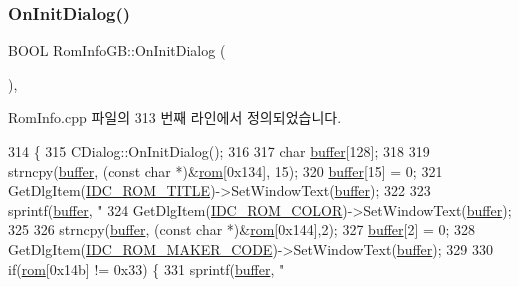 \subsubsection{\texorpdfstring{On\+Init\+Dialog()}{OnInitDialog()}}
{\footnotesize\ttfamily B\+O\+OL Rom\+Info\+G\+B\+::\+On\+Init\+Dialog (\begin{DoxyParamCaption}{ }\end{DoxyParamCaption})\hspace{0.3cm}{\ttfamily [protected]}, {\ttfamily [virtual]}}



Rom\+Info.\+cpp 파일의 313 번째 라인에서 정의되었습니다.


\begin{DoxyCode}
314 \{
315   CDialog::OnInitDialog();
316   
317   \textcolor{keywordtype}{char} \mbox{\hyperlink{_g_b_a_8cpp_a28d4d3d8445e73a696b2d6f7eadabd96}{buffer}}[128];
318   
319   strncpy(\mbox{\hyperlink{_g_b_a_8cpp_a28d4d3d8445e73a696b2d6f7eadabd96}{buffer}}, (\textcolor{keyword}{const} \textcolor{keywordtype}{char} *)&\mbox{\hyperlink{class_rom_info_g_b_ab7ac87e9a9566fce1f057d7c37f60770}{rom}}[0x134], 15);
320   \mbox{\hyperlink{_g_b_a_8cpp_a28d4d3d8445e73a696b2d6f7eadabd96}{buffer}}[15] = 0;
321   GetDlgItem(\mbox{\hyperlink{resource_8h_abb84afdca45bbfe3549191640e97be63}{IDC\_ROM\_TITLE}})->SetWindowText(\mbox{\hyperlink{_g_b_a_8cpp_a28d4d3d8445e73a696b2d6f7eadabd96}{buffer}});
322 
323   sprintf(\mbox{\hyperlink{_g_b_a_8cpp_a28d4d3d8445e73a696b2d6f7eadabd96}{buffer}}, \textcolor{stringliteral}{"%
324   GetDlgItem(\mbox{\hyperlink{resource_8h_ad24ea8b3b578f21705eaae467deb6d99}{IDC\_ROM\_COLOR}})->SetWindowText(\mbox{\hyperlink{_g_b_a_8cpp_a28d4d3d8445e73a696b2d6f7eadabd96}{buffer}});
325   
326   strncpy(\mbox{\hyperlink{_g_b_a_8cpp_a28d4d3d8445e73a696b2d6f7eadabd96}{buffer}}, (\textcolor{keyword}{const} \textcolor{keywordtype}{char} *)&\mbox{\hyperlink{class_rom_info_g_b_ab7ac87e9a9566fce1f057d7c37f60770}{rom}}[0x144],2);
327   \mbox{\hyperlink{_g_b_a_8cpp_a28d4d3d8445e73a696b2d6f7eadabd96}{buffer}}[2] = 0;
328   GetDlgItem(\mbox{\hyperlink{resource_8h_adb5db445e06db6bc262e4d08818ad07b}{IDC\_ROM\_MAKER\_CODE}})->SetWindowText(\mbox{\hyperlink{_g_b_a_8cpp_a28d4d3d8445e73a696b2d6f7eadabd96}{buffer}});
329 
330   \textcolor{keywordflow}{if}(\mbox{\hyperlink{class_rom_info_g_b_ab7ac87e9a9566fce1f057d7c37f60770}{rom}}[0x14b] != 0x33) \{
331     sprintf(\mbox{\hyperlink{_g_b_a_8cpp_a28d4d3d8445e73a696b2d6f7eadabd96}{buffer}}, \textcolor{stringliteral}{"%
}}
\end{DoxyCode}

